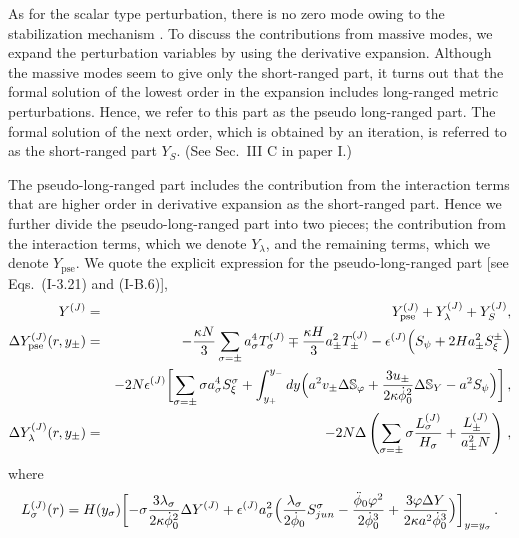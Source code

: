 \documentclass[a4paper,showpacs,preprintnumbers,amsmath,amssymb]{revtex4}
\begin{document}
 
As for the scalar type perturbation, there is no zero mode owing to the stabilization mechanism \cite{Tanaka:2000er}. 
To discuss the contributions from massive modes, we expand the perturbation variables by using the derivative expansion.  Although the massive modes seem to give only the short-ranged part, it turns out that the formal solution of the lowest order in the expansion includes long-ranged metric perturbations. Hence, we refer to this part as the pseudo long-ranged part. The formal solution of the next order, which is obtained by an iteration, is referred to as the short-ranged part $Y_S$.  
(See Sec.~III C in paper I.)

The pseudo-long-ranged part includes the contribution from the interaction terms that are higher order in derivative expansion as the short-ranged part. Hence we further divide the pseudo-long-ranged part into two pieces; the contribution from the interaction terms, which we denote $Y_{\lambda}$, and the remaining terms, which we denote $Y_{ \mathrm{pse}}$.
We quote the explicit expression for the pseudo-long-ranged part [see Eqs.~(I-3.21) and (I-B.6)], 
\begin{eqnarray}
 Y^{(J)} &=& Y^{(J)}_{ {\mathrm{pse}} } + Y^{(J)}_{\lambda} + Y^{(J)}_{S} , 
\label{eq:Y=Y_0+Y_S}
\cr
 \Delta Y^{(J)}_{\mathrm{pse} } (r, y_{\pm})
   &=& 
  - \frac{\kappa N}{3} \sum_{\sigma=\pm} a_{\sigma}^4 
    T^{(J)}_{\sigma}  
    \mp \frac{\kappa H}{3} a_{\pm}^2 T_{\pm}^{(J)}
 - \epsilon ^{(J)} 
 \Bigl(  S_\psi + 2H a_{\pm}^2 S_{\xi}^{\pm}
 \Bigr) 
\nonumber
\\
&&
   - 2N \epsilon^{(J)} \biggl[
     \sum_{\sigma=\pm} \sigma a_{\sigma}^4
     S_{\xi}^{\sigma} 
   + \int^{y_{-}}_{y_{+}} dy 
 \Bigl(
      a^2 v_{\pm} \Delta {\mathbb S}_\varphi 
    + \frac{3u_{\pm}} {2\kappa \dot \phi_0^2} \Delta {\mathbb S}_Y 
    -a^2 S_\psi 
  \Bigr)
\biggr] \,,
\label{eq:Y^J_[0] y_+-}
\cr
\Delta  Y^{(J)}_{ \lambda } (r, y_\pm)
&=&
 - 2N  \Delta  \left(  
    \sum_{\sigma= \pm} \sigma  \frac{ L_\sigma^{(J)} }{H_\sigma}
  + \frac{ L_\pm^{(J)} }{a^2_\pm N} 
  \right) \,,
\label{eq:Y^J_[0lambda] y_+-}
\end{eqnarray}
where  
\begin{eqnarray}
 L_\sigma^{(J)}(r) = H(y_\sigma)
   \biggl[ 
    - \sigma \frac{3 \lambda_{\sigma}}{2\kappa\dot\phi_0^2} \Delta  Y^{(J)}
   + \epsilon^{(J)} a_{\sigma}^2
  \Bigl( 
    \frac{ \lambda_{\sigma}}{2\dot\phi_0} S^{\sigma}_{jun} 
  - \frac{ \ddot\phi_0  \varphi^2}{2 \dot\phi_0^3} 
  + \frac{3 \varphi  \Delta  Y }
      {2\kappa a^2 \dot\phi_0^3}
  \Bigr) 
   \biggr] _{y=y_{\sigma}}\,.
\label{eq:L_sigma}
\end{eqnarray}
\end{document}
